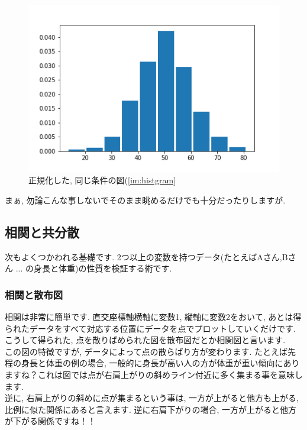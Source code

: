 \documentclass[11pt,a4paper]{jreport}
\begin{document}
\begin{figure}[H]
\label{im:z-hist}
  \centering
  \includegraphics[width=120mm,bb=0 0 432 288]{figures/z-hist.png}
  \caption{正規化した, 同じ条件の図(\ref{im:histgram}}
\end{figure}

まぁ, 勿論こんな事しないでそのまま眺めるだけでも十分だったりしますが.

\subsection{相関と共分散}
次もよくつかわれる基礎です. 2つ以上の変数を持つデータ(たとえばAさん,Bさん ... の身長と体重)の性質を検証する術です. \\
\subsubsection{相関と散布図}
相関は非常に簡単です. 直交座標軸横軸に変数1, 縦軸に変数2をおいて, あとは得られたデータをすべて対応する位置にデータを点でプロットしていくだけです. こうして得られた, 点を散りばめられた図を散布図だとか相関図と言います.\\
この図の特徴ですが, データによって点の散らばり方が変わります. たとえば先程の身長と体重の例の場合, 一般的に身長が高い人の方が体重が重い傾向にありますね？これは図では点が右肩上がりの斜めライン付近に多く集まる事を意味します. \\
逆に, 右肩上がりの斜めに点が集まるという事は, 一方が上がると他方も上がる, 比例に似た関係にあると言えます. 逆に右肩下がりの場合, 一方が上がると他方が下がる関係ですね！！\\
\end{document}
